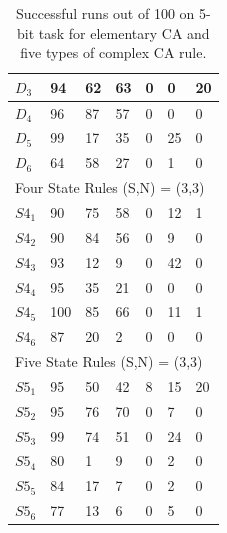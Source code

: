 \documentclass{facconf}
\begin{document}
\begin{multicols}{2}
\begin{table}[!htb]
\begin{tabular}{|l|l|l|l|l|l|l|}
$D_{3}$ & 94 & 62 & 63 & 0 & 0 & 20 \\ \hline
$D_{4}$ & 96 & 87 & 57 & 0 & 0 & 0 \\ \hline
$D_{5}$ & 99 & 17 & 35 & 0 & 25 & 0 \\ \hline
$D_{6}$ & 64 & 58 & 27 & 0 & 1 & 0 \\ \hline
\multicolumn{7}{|l|}{Four State Rules (S,N) = (3,3)} \\ \hline
$S4_{1}$ & 90 & 75 & 58 & 0 & 12  & 1 \\ \hline
$S4_{2}$ & 90 & 84 & 56 & 0 & 9 & 0  \\ \hline
$S4_{3}$ & 93 & 12 & 9 & 0 & 42 & 0 \\ \hline
$S4_{4}$ & 95 & 35 & 21 & 0 & 0 & 0 \\ \hline
$S4_{5}$ & 100 & 85 & 66 & 0 & 11 & 1 \\ \hline
$S4_{6}$ & 87 & 20 & 2 & 0 & 0 & 0 \\ \hline
\multicolumn{7}{|l|}{Five State Rules (S,N) = (3,3)} \\ \hline
$S5_{1}$ & 95 & 50 & 42 & 8 & 15 & 20 \\ \hline
$S5_{2}$ & 95 & 76 & 70 & 0 & 7 & 0 \\ \hline
$S5_{3}$ & 99 & 74 & 51 & 0 & 24 & 0 \\ \hline
$S5_{4}$ & 80 & 1 & 9 & 0 & 2 & 0 \\ \hline
$S5_{5}$ & 84 & 17 & 7 & 0 & 2 & 0 \\ \hline
$S5_{6}$ & 77 & 13 & 6 & 0 & 5 & 0 \\ \hline
\end{tabular}
\caption{Successful runs out of 100 on 5-bit task for elementary CA and five 
    types of complex CA rule.}
\label{table:results}
\end{table}



\end{multicols}
\end{document}
